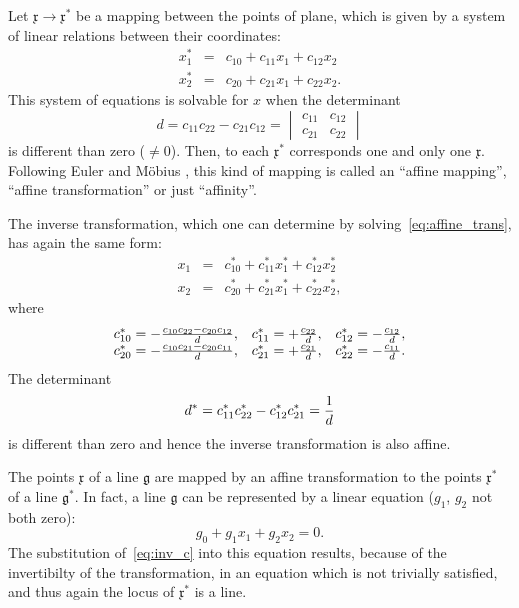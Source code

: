 \documentclass[11pt]{book} \usepackage{amssymb}
\newcommand{\myvec}[1]{\mathfrak{#1}}
\begin{document}
Let $\myvec{x}\to \myvec{x}^*$ be a mapping between the points of plane,
which is given by a system of linear relations between their coordinates:
\begin{equation}
  \label{eq:affine_trans}
  \begin{array}{rcl}
    x_1^* &=& c_{10}+c_{11}x_1+c_{12}x_2\\
    x_2^* &=& c_{20}+c_{21}x_1+c_{22}x_2.
  \end{array}
\end{equation}
This system of equations is solvable for $x$ when the determinant 
\begin{equation}
  d=c_{11}c_{22}-c_{21}c_{12}=
  \begin{vmatrix}
    c_{11} & c_{12}\\
    c_{21} & c_{22}
  \end{vmatrix}
\end{equation}
is different than zero ($\neq 0$). Then, to each $\myvec{x}^*$ corresponds 
one and only one $\myvec{x}$. Following Euler \cite{Euler:1749} and 
M\"obius \cite{Mobius:1827}, this kind of mapping
is called an ``affine mapping'', ``affine transformation'' or just ``affinity''.
 
The inverse transformation, which one can determine by 
solving~\eqref{eq:affine_trans}, has again the same form: 
\begin{equation}
  \label{eq:affine_trans_inv}
  \begin{array}{rcl}
    x_1 &=& c_{10}^*+c_{11}^*x_1^*+c_{12}^*x_2^*\\
    x_2 &=& c_{20}^*+c_{21}^*x_1^*+c_{22}^*x_2^*,
  \end{array}
\end{equation}
where
\begin{equation}
  \label{eq:inv_c}
  \begin{array}{lll}
    c_{10}^*=-{c_{10}c_{22}-c_{20}c_{12} \over d},& c_{11}^*=+{c_{22}\over d},&c_{12}^*=-{c_{12}\over d},\\
    c_{20}^*=-{c_{10}c_{21}-c_{20}c_{11} \over d},& c_{21}^*=+{c_{21}\over d},&c_{22}^*=-{c_{11}\over d}.
  \end{array}
\end{equation}
The determinant
\begin{equation}
  \label{eq:inv_det}
  d^*=c_{11}^*c_{22}^*-c_{12}^*c_{21}^*={1\over d}
\end{equation}
is different than zero and hence the inverse transformation is also affine.

The points $\myvec{x}$ of a line $\mathfrak{g}$ are mapped by an affine 
transformation to
the points $\myvec{x}^*$ of a line $\mathfrak{g}^*$. In fact, a line 
$\mathfrak{g}$ can be
represented by a linear equation ($g_1$, $g_2$ not both zero):
\begin{equation}
  \label{eq:line}
  g_0+g_1x_1+g_2x_2=0.
\end{equation}
The substitution of~\eqref{eq:inv_c} into this equation results, because of the
invertibilty of the transformation, in an equation which is not trivially
satisfied, and thus again the locus of $\myvec{x}^*$ is a line.
\end{document}
